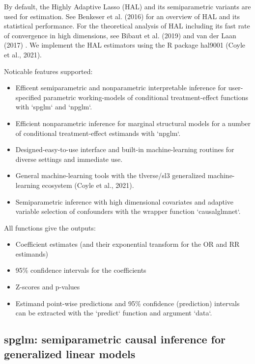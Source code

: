 \documentclass[article]{jss}
\begin{document}
By default, the Highly Adaptive Lasso (HAL) and its semiparametric variants are used for estimation. See Benkeser et al. (2016) for an overview of HAL and its statistical performance. For the theoretical analysis of HAL including its fast rate of convergence in high dimensions, see Bibaut et al. (2019) and van der Laan (2017) \nocite{bibaut2019fast}\nocite{HAL2016}\nocite{vanderlaanGenerlaTMLE}. We implement the HAL estimators using the R package hal9001 (Coyle et al., 2021).\nocite{hal1}\nocite{hal2} 
\nocite{vanderlaanGenerlaTMLE} 

Noticable features supported:
\begin{itemize}
\item Efficent semiparametric and nonparametric interpretable inference for user-specified parametric working-models of conditional treatment-effect functions with `spglm` and `npglm`.
\item  Efficient nonparametric inference for marginal structural models for a number of conditional treatment-effect estimands with `npglm`.
\item Designed-easy-to-use interface and built-in machine-learning routines for diverse settings and immediate use.
\item  General machine-learning tools with the tlverse/sl3 generalized machine-learning ecosystem (Coyle et al., 2021).\nocite{coyle2021sl3}
\item  Semiparametric inference with high dimensional covariates and adaptive variable selection of confounders with the wrapper function `causalglmnet`.
\end{itemize}

All functions give the outputs: 
\begin{itemize}
\item Coefficient estimates (and their exponential transform for the OR and RR estimands)
\item 95\% confidence intervals for the coefficients
\item Z-scores and p-values
\item Estimand point-wise predictions and 95\% confidence (prediction) intervals can be extracted with the `predict` function and argument `data`.
\end{itemize}

\subsection{spglm: semiparametric causal inference for generalized linear models}
\end{document}

